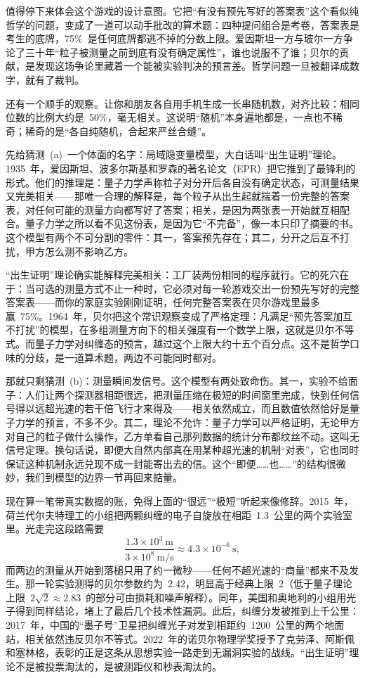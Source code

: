 值得停下来体会这个游戏的设计意图。它把“有没有预先写好的答案表”这个看似纯哲学的问题，变成了一道可以动手批改的算术题：四种提问组合是考卷，答案表是考生的底牌，75\%~是任何底牌都逃不掉的分数上限。爱因斯坦一方与玻尔一方争论了三十年“粒子被测量之前到底有没有确定属性”，谁也说服不了谁；贝尔的贡献，是发现这场争论里藏着一个能被实验判决的预言差。哲学问题一旦被翻译成数字，就有了裁判。

还有一个顺手的观察。让你和朋友各自用手机生成一长串随机数，对齐比较：相同位数的比例大约是~50\%，毫无相关。这说明“随机”本身遍地都是，一点也不稀奇；稀奇的是“各自纯随机，合起来严丝合缝”。


先给猜测~(a)~一个体面的名字：局域隐变量模型，大白话叫“出生证明”理论。1935~年，爱因斯坦、波多尔斯基和罗森的著名论文（EPR）把它推到了最锋利的形式。他们的推理是：量子力学声称粒子对分开后各自没有确定状态，可测量结果又完美相关——那唯一合理的解释是，每个粒子从出生起就揣着一份完整的答案表，对任何可能的测量方向都写好了答案；相关，是因为两张表一开始就互相配合。量子力学之所以看不见这份表，是因为它“不完备”，像一本只印了摘要的书。这个模型有两个不可分割的零件：其一，答案预先存在；其二，分开之后互不打扰，甲方怎么测不影响乙方。

“出生证明”理论确实能解释完美相关：工厂装两份相同的程序就行。它的死穴在于：当可选的测量方式不止一种时，它必须对每一轮游戏交出一份预先写好的完整答案表——而你的家庭实验刚刚证明，任何完整答案表在贝尔游戏里最多赢~75\%。1964~年，贝尔把这个常识观察变成了严格定理：凡满足“预先答案加互不打扰”的模型，在多组测量方向下的相关强度有一个数学上限，这就是贝尔不等式。而量子力学对纠缠态的预言，越过这个上限大约十五个百分点。这不是哲学口味的分歧，是一道算术题，两边不可能同时都对。

那就只剩猜测~(b)：测量瞬间发信号。这个模型有两处致命伤。其一，实验不给面子：人们让两个探测器相距很远，把测量压缩在极短的时间窗里完成，快到任何信号得以远超光速的若干倍飞行才来得及——相关依然成立，而且数值依然恰好是量子力学的预言，不多不少。其二，理论不允许：量子力学可以严格证明，无论甲方对自己的粒子做什么操作，乙方单看自己那列数据的统计分布都纹丝不动。这叫无信号定理。换句话说，即便大自然内部真在用某种超光速的机制“对表”，它也同时保证这种机制永远兑现不成一封能寄出去的信。这个“即便……也……”的结构很微妙，我们到模型的边界一节再回来掂量。

现在算一笔带真实数据的账，免得上面的“很远”“极短”听起来像修辞。2015~年，荷兰代尔夫特理工的小组把两颗纠缠的电子自旋放在相距~1.3~公里的两个实验室里。光走完这段路需要
\[
\frac{1.3\times10^{3}\ \text{m}}{3\times10^{8}\ \text{m/s}}\approx4.3\times10^{-6}\ \text{s},
\]
而两边的测量从开始到落槌只用了约一微秒——任何不超光速的“商量”都来不及发生。那一轮实验测得的贝尔参数约为~2.42，明显高于经典上限~2（低于量子理论上限~\(2\sqrt2\approx2.83\)~的部分可由损耗和噪声解释）。同年，美国和奥地利的小组用光子得到同样结论，堵上了最后几个技术性漏洞。此后，纠缠分发被推到上千公里：2017~年，中国的“墨子号”卫星把纠缠光子对发到相距约~1200~公里的两个地面站，相关依然违反贝尔不等式。2022~年的诺贝尔物理学奖授予了克劳泽、阿斯佩和塞林格，表彰的正是这条从思想实验一路走到无漏洞实验的战线。“出生证明”理论不是被投票淘汰的，是被测距仪和秒表淘汰的。

